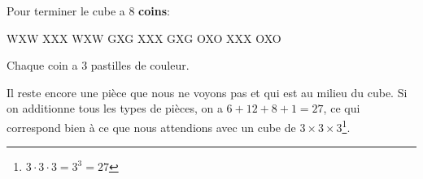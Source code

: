 Pour terminer le cube a 8 \textbf{coins}:

\begin{center}
	\RubikFaceUp%
	{W}{X}{W}%
	{X}{X}{X}%
	{W}{X}{W}
	\RubikFaceRight%
	{G}{X}{G}%
	{X}{X}{X}%
	{G}{X}{G}
	\RubikFaceFront%
	{O}{X}{O}%
	{X}{X}{X}%
	{O}{X}{O}
\end{center}

Chaque coin a 3 pastilles de couleur.

Il reste encore une pièce que nous ne voyons pas et qui est au milieu du cube. Si on additionne tous les types de pièces, on a $6 + 12 + 8 + 1 = 27$, ce qui correspond bien à ce que nous attendions avec un cube de $3 \times 3 \times 3$\footnote{$3 \cdot 3 \cdot 3 = 3^3 = 27$}.